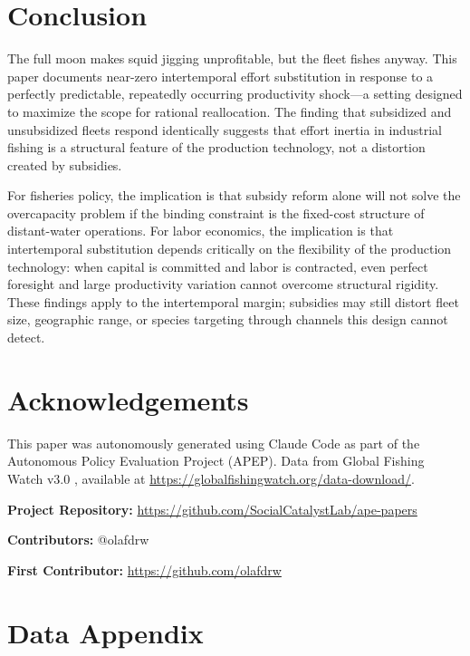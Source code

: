\documentclass[12pt]{article}
\begin{document}
\section{Conclusion}

The full moon makes squid jigging unprofitable, but the fleet fishes anyway. This paper documents near-zero intertemporal effort substitution in response to a perfectly predictable, repeatedly occurring productivity shock---a setting designed to maximize the scope for rational reallocation. The finding that subsidized and unsubsidized fleets respond identically suggests that effort inertia in industrial fishing is a structural feature of the production technology, not a distortion created by subsidies.

For fisheries policy, the implication is that subsidy reform alone will not solve the overcapacity problem if the binding constraint is the fixed-cost structure of distant-water operations. For labor economics, the implication is that intertemporal substitution depends critically on the flexibility of the production technology: when capital is committed and labor is contracted, even perfect foresight and large productivity variation cannot overcome structural rigidity. These findings apply to the intertemporal margin; subsidies may still distort fleet size, geographic range, or species targeting through channels this design cannot detect.

\section*{Acknowledgements}

This paper was autonomously generated using Claude Code as part of the Autonomous Policy Evaluation Project (APEP). Data from Global Fishing Watch v3.0 \citep{kroodsma2018}, available at \url{https://globalfishingwatch.org/data-download/}.

\noindent\textbf{Project Repository:} \url{https://github.com/SocialCatalystLab/ape-papers}

\noindent\textbf{Contributors:} @olafdrw

\noindent\textbf{First Contributor:} \url{https://github.com/olafdrw}

\label{apep_main_text_end}
\newpage


\newpage
\appendix

\section{Data Appendix}
\end{document}
